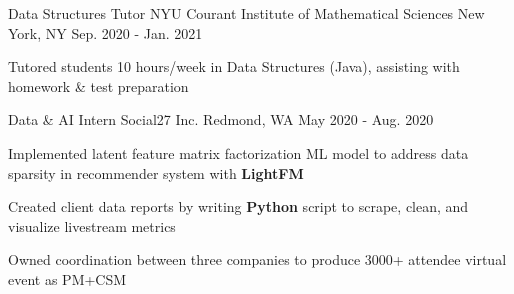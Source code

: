 \begin{cventries}
    \cventry
    {Data Structures Tutor} %
    {NYU Courant Institute of Mathematical Sciences} %
    {New York, NY} %
    {Sep. 2020 - Jan. 2021} %
    {
      \begin{cvitems} %
        \item {Tutored students 10 hours/week in Data Structures (Java), assisting with homework \& test preparation}
      \end{cvitems}
    }

  \cventry
    {Data \& AI Intern} %
    {Social27 Inc.} %
    {Redmond, WA} %
    {May 2020 - Aug. 2020} %
    {
      \begin{cvitems} %
        \item {Implemented latent feature matrix factorization ML model to address data sparsity in recommender system with \textbf{LightFM}}
        \item {Created client data reports by writing \textbf{Python} script to scrape, clean, and visualize livestream metrics}
        \item {Owned coordination between three companies to produce 3000+ attendee virtual event as PM+CSM}
      \end{cvitems}
    }


\end{cventries}